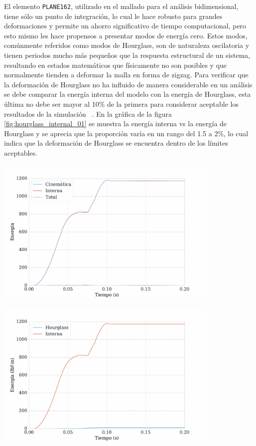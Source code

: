 El elemento \texttt{PLANE162}, utilizado en el mallado para el análisis bidimensional, 
tiene sólo un punto de integración, lo cual le hace robusto para grandes deformaciones 
y permite un ahorro significativo de tiempo computacional, pero esto mismo les hace 
propensos a presentar modos de energía cero. Estos modos, comúnmente referidos como 
modos de Hourglass, son de naturaleza oscilatoria y tienen periodos mucho más pequeños 
que la respuesta estructural de un sistema, resultando en estados matemáticos que físicamente 
no son posibles y que normalmente tienden a deformar la malla en forma de zigzag.
Para verificar que la deformación de Hourglass no ha influido de manera considerable 
en un análisis se debe comparar la energía interna del modelo con la energía de Hourglass, 
esta última no debe ser mayor al 10\% de la primera para considerar aceptable los 
resultados de la simulación ~\cite{lsdyna-ansys-manual}. En la gráfica de la figura \ref{fig:hourglass_internal_01} 
se muestra la energía interna vs la energía de Hourglass y se aprecia que la proporción 
varía en un rango del 1.5 a 2\%, lo cual indica que la deformación de Hourglass se encuentra 
dentro de los límites aceptables.

\begin{center}
\includegraphics[width=0.8\textwidth]{src/ch4/energy_status_01.pdf}
\label{fig:energy_status_01}
\end{center}


\begin{center}
\includegraphics[width=0.8\textwidth]{src/ch4/hourglass_internal_01.pdf}
\label{fig:hourglass_internal_01}
\end{center}


